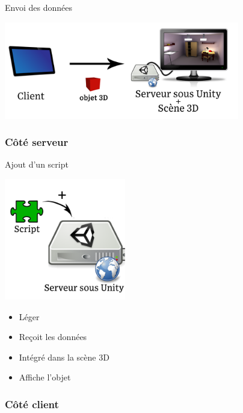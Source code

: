 \documentclass[a4paper,10pt]{beamer}
\begin{document}
	\begin{frame}{Envoi des données}
		\centerline{\includegraphics[height=120pt]{images/network/sending_model2.png}}
	\end{frame}
	
	\subsubsection{Côté serveur}
	\begin{frame}{Ajout d'un script}
		\centerline{\includegraphics[height=150pt]{images/network/plugin.png}}
		\begin{itemize}	
			\item \pause Léger \pause
			\item Reçoit les données \pause
			\item Intégré dans la scène 3D \pause
			\item Affiche l'objet 
		\end{itemize}	
		
	\end{frame}
	
	\subsubsection{Côté client}
	
\end{document}
